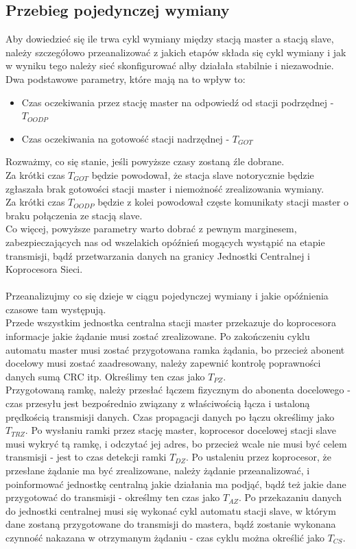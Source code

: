 	\subsection{Przebieg pojedynczej wymiany}
	Aby dowiedzieć się ile trwa cykl wymiany między stacją master a stacją slave, należy szczegółowo przeanalizować z jakich etapów składa się cykl wymiany i jak w wyniku tego należy sieć skonfigurować alby działała stabilnie i niezawodnie. Dwa podstawowe parametry, które mają na to wpływ to:
	\begin{itemize}
		\item Czas oczekiwania przez stację master na odpowiedź od stacji podrzędnej - $ T_{OODP} $
		\item Czas oczekiwania na gotowość stacji nadrzędnej -  $ T_{GOT} $
	\end{itemize}
	Rozważmy, co się stanie, jeśli powyższe czasy zostaną źle dobrane. \\ Za krótki czas $ T_{GOT} $ będzie powodował, że stacja slave notorycznie będzie zgłaszała brak gotowości stacji master i niemożność zrealizowania wymiany. \\
	Za krótki czas $ T_{OODP} $ będzie z kolei powodował częste komunikaty stacji master o braku połączenia ze stacją slave. \\
	Co więcej, powyższe parametry warto dobrać z pewnym marginesem, zabezpieczających nas od wszelakich opóźnień mogących wystąpić na etapie transmisji, bądź przetwarzania danych na granicy Jednostki Centralnej i Koprocesora Sieci.\\
	\\
	Przeanalizujmy co się dzieje w ciągu pojedynczej wymiany i jakie opóźnienia czasowe tam występują.\\
	Przede wszystkim jednostka centralna stacji master przekazuje do koprocesora informacje jakie żądanie musi zostać zrealizowane. Po zakończeniu cyklu automatu master musi zostać przygotowana ramka żądania, bo przecież abonent docelowy musi zostać zaadresowany, należy zapewnić kontrolę poprawności danych sumą CRC itp. Określimy ten czas jako $ T_{PZ} $. \\
	Przygotowaną ramkę, należy przesłać łączem fizycznym do abonenta docelowego - czas przesyłu jest bezpośrednio związany z właściwością łącza i ustaloną prędkością transmisji danych. Czas propagacji danych po łączu określimy jako $ T_{TRZ} $. Po wysłaniu ramki przez stację master, koprocesor docelowej stacji slave musi wykryć tą ramkę, i odczytać jej adres, bo przecież wcale nie musi być celem transmisji - jest to czas detekcji ramki $ T_{DZ} $. Po ustaleniu przez koprocesor, że przesłane żądanie ma być zrealizowane, należy żądanie przeanalizować, i poinformować jednostkę centralną jakie działania ma podjąć, bądź też jakie dane przygotować do transmisji - określmy ten czas jako $ T_{AZ} $. Po przekazaniu danych do jednostki centralnej musi się wykonać cykl automatu stacji slave, w którym dane zostaną przygotowane do transmisji do mastera, bądź zostanie wykonana czynność nakazana w otrzymanym żądaniu - czas cyklu można określić jako $ T_{CS} $.\\
